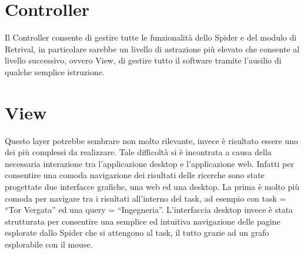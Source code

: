 \section{Controller}
Il Controller consente di gestire tutte le funzionalità dello Spider e del modulo di Retrival, in particolare sarebbe un livello di astrazione più elevato che consente al livello successivo, ovvero View, di gestire tutto il software tramite l'ausilio di qualche semplice istruzione.
\section{View}
Questo layer potrebbe sembrare non molto rilevante, invece è risultato essere uno dei più complessi da realizzare. Tale difficoltà si è incontrata a causa della necessaria interazione tra l'applicazione desktop e l'applicazione web. Infatti per consentire una comoda navigazione dei risultati delle ricerche sono state progettate due interfacce grafiche, una web ed una desktop. La prima è molto più comoda per navigare tra i risultati all'interno del task, ad esempio con task = ``Tor Vergata'' ed una query = ``Ingegneria''. L'interfaccia desktop invece è stata strutturata per consentire una semplice ed intuitiva navigazione delle pagine esplorate dallo Spider che si attengono al task, il tutto grazie ad un grafo esplorabile con il mouse.